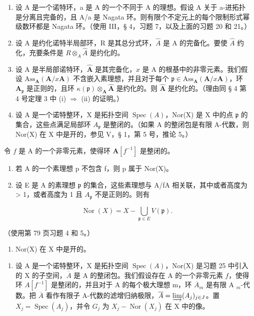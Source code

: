 \begin{enumerate}
\def\labelenumi{\arabic{enumi})}
\setcounter{enumi}{21}
\item
  设 A 是一个诺特环，a 是 A 的一个不同于 A 的理想。假设 A 关于 a-进拓扑是分离且完备的，且 A/a 是 Nagata 环。则有限个不定元上的每个限制形式幂级数环都是 Nagata 环。（使用 III，§ 4，习题 7，以及上面的习题 20 和 21。）
\item
  设 A 是约化诺特半局部环，R 是其总分式环，\(\hat{A}\) 是 A 的完备化。要使 \(\hat{A}\) 约化，充要条件是 \(R \otimes_{A} \hat{A}\) 是约化的。
\item
  设 A 是半局部诺特环，\(\hat{\mathbf{A}}\) 是其完备化，\(x\) 是 A 的根基中的非零元素。我们假设 \(\mathrm{Ass}_{\mathbf{A}}(\mathbf{A}/x\mathbf{A})\) 不含嵌入素理想，并且对于每个 \(\mathfrak{p} \in \mathrm{Ass}_{\mathbf{A}}(\mathbf{A}/x\mathbf{A})\)，环 \(\mathbf{A}_{\mathfrak{p}}\) 是正则的，且环 \(\kappa(\mathfrak{p}) \otimes_{\mathbf{A}} \hat{\mathbf{A}}\) 是约化的。则 \(\hat{\mathbf{A}}\) 是约化的。（理由同 § 4 第 4 号定理 3 中 (i) \(\Rightarrow\) (ii) 的证明。）
\item
  设 A 是一个诺特整环，X 是拓扑空间 \(\operatorname{Spec}(A)\)，Nor(X) 是 X 中的点 \(\mathfrak{p}\) 的集合，这些点满足局部环 \(A_{\mathfrak{p}}\) 是整闭的。（如果 A 的整闭包是有限 A-代数，则 Nor(X) 在 X 中是开的，参见 V，§ 1，第 5 号，推论 5。）
\end{enumerate}

令 \(f\) 是 A 的一个非零元素，使得环 \(\mathbf{A}[f^{-1}]\) 是整闭的。

\begin{enumerate}
\def\labelenumi{\alph{enumi})}
\item
  若 A 的一个素理想 p 不包含 f，则 p 属于 Nor(X)。
\item
  设 E 是 A 的素理想 \(\mathfrak{p}\) 的集合，这些素理想与 A/fA 相关联，其中或者高度为 \textgreater{} 1，或者高度为 1 且 \(A_{\mathfrak{p}}\) 不是正则的。则有
\end{enumerate}

\[
\operatorname{Nor} (X) = X - \bigcup_ {\mathfrak {p} \in E} V (\mathfrak {p}).
\]

（使用第 79 页习题 4 和 5。）

\begin{enumerate}
\def\labelenumi{\alph{enumi})}
\setcounter{enumi}{2}
\tightlist
\item
  Nor(X) 在 X 中是开的。
\end{enumerate}

\begin{enumerate}
\def\labelenumi{\arabic{enumi})}
\setcounter{enumi}{25}
\tightlist
\item
  设 A 是一个诺特整环，X 是拓扑空间 \(\operatorname{Spec}(A)\)，Nor(X) 是习题 25 中引入的 X 的子空间，\(\overline{A}\) 是 A 的整闭包。我们假设存在 A 的一个非零元素 \(f\)，使得环 \(A[f^{-1}]\) 是整闭的，并且对于 A 的每个极大理想 m，环 \(\overline{A}_{m}\) 是有限 A \(_{m}\)-代数。把 \(\overline{A}\) 看作有限子 A-代数的滤增归纳极限，\(\overline{A} = \varinjlim(A_{j})_{j\in J}\)。置 \(X_{j} = \operatorname{Spec}(A_{j})\)，并令 \(G_{j}\) 为 \(X_{j} - \operatorname{Nor}(X_{j})\) 在 X 中的像。
\end{enumerate}

